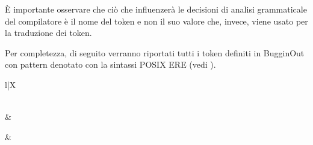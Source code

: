 \`E importante osservare che ci\`o che influenzer\`a le decisioni di analisi grammaticale del compilatore \`e il nome del token e non il suo valore che, invece, viene usato per la traduzione dei token.

Per completezza, di seguito verranno riportati tutti i token definiti in BugginOut con pattern denotato con la sintassi POSIX ERE (vedi \cite{iso-9945-2009}).

\begin{xltabular}{\textwidth}{l|X}
	\caption{Token di BugginOut}
	\label{fig:bugginout-complete-tokens} \\

	\hline
	\hline
	 &  \\
	\hline
	\endfirsthead

	\hline
	 &  \\
	\hline
	\endhead

	\hline
	\endfoot

	\hline
	\hline
	\endlastfoot


\end{xltabular}
